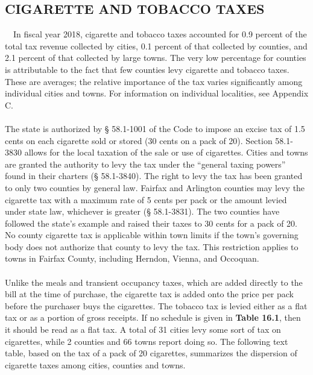 \documentclass[
]{book}
\begin{document}
\hypertarget{cigarette-and-tobacco-taxes}{%
\subsection{CIGARETTE AND TOBACCO TAXES}\label{cigarette-and-tobacco-taxes}}

~~In fiscal year 2018, cigarette and tobacco taxes accounted for 0.9 percent of the total tax revenue collected by cities, 0.1 percent of that collected by counties, and 2.1 percent of that collected by large towns. The very low percentage for counties is attributable to the fact that few counties levy cigarette and tobacco taxes. These are averages; the relative importance of the tax varies significantly among individual cities and towns. For information on individual localities, see Appendix C.\\
~\\
\hspace*{0.333em}\hspace*{0.333em}The state is authorized by § 58.1-1001 of the Code to impose an excise tax of 1.5 cents on each cigarette sold or stored (30 cents on a pack of 20). Section 58.1-3830 allows for the local taxation of the sale or use of cigarettes. Cities and towns are granted the authority to levy the tax under the ``general taxing powers'' found in their charters (§ 58.1-3840). The right to levy the tax has been granted to only two counties by general law. Fairfax and Arlington counties may levy the cigarette tax with a maximum rate of 5 cents per pack or the amount levied under state law, whichever is greater (§ 58.1-3831). The two counties have followed the state's example and raised their taxes to 30 cents for a pack of 20. No county cigarette tax is applicable within town limits if the town's governing body does not authorize that county to levy the tax. This restriction applies to towns in Fairfax County, including Herndon, Vienna, and Occoquan.\\
~\\
\hspace*{0.333em}\hspace*{0.333em}Unlike the meals and transient occupancy taxes, which are added directly to the bill at the time of purchase, the cigarette tax is added onto the price per pack before the purchaser buys the cigarettes. The tobacco tax is levied either as a flat tax or as a portion of gross receipts. If no schedule is given in \textbf{Table 16.1}, then it should be read as a flat tax. A total of 31 cities levy some sort of tax on cigarettes, while 2 counties and 66 towns report doing so. The following text table, based on the tax of a pack of 20 cigarettes, summarizes the dispersion of cigarette taxes among cities, counties and towns.
\end{document}
